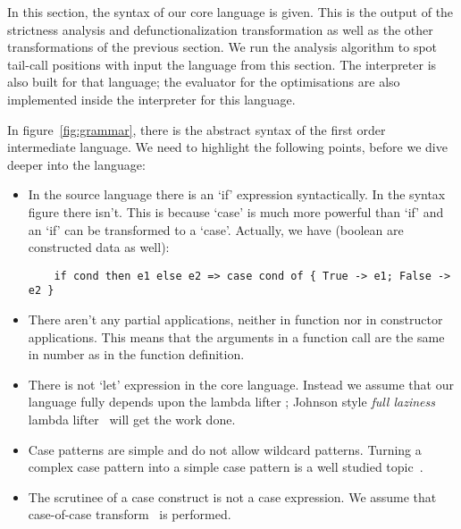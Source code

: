 \documentclass[diploma]{softlab-thesis}
\begin{document}
In this section, the syntax of our core language is given.
This is the output of the strictness analysis and 
defunctionalization transformation as well as the other transformations of the previous 
section. We run the analysis algorithm to spot tail-call positions with input 
the language from this section. The interpreter is also built for that language; the evaluator for 
the optimisations are also implemented inside the interpreter for this language.
\newline
\par In figure~\ref{fig:grammar}, there is the abstract syntax of 
the first order intermediate language.
We need to highlight the following points, before we dive deeper into the language:
\begin{itemize}
  \item In the source language there is an `if' expression syntactically. In the syntax figure there isn't.
  This is because `case' is much more powerful than `if' and an `if' can be transformed to a `case'. 
  Actually, we have (boolean are constructed data as well):
  \begin{verbatim}
    if cond then e1 else e2 => case cond of { True -> e1; False -> e2 }
  \end{verbatim}
  \item There aren't any partial applications, neither in function nor in constructor applications.
  This means that the arguments in a function call are the same in number as in the function definition.
  \item There is not `let' expression in the core language. Instead we assume that our language 
  fully depends upon the lambda lifter ; Johnson style \textit{full laziness} lambda lifter~\cite{Johnsson:1985:LLT:5280.5292}
  will get the work done.
  \item Case patterns are simple and do not allow wildcard patterns. Turning a complex case pattern into
  a simple case pattern is a well studied topic~\cite{Au85,Wadler87}.
  \item The scrutinee of a case construct is not a case expression. We assume that case-of-case 
  transform~\cite{Jone98} is performed.
\end{itemize}
\end{document}
